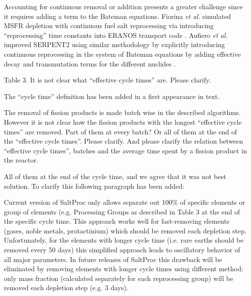 \documentclass[answers,11pt]{exam}
\begin{document}
\begin{questions}
\begin{solution}
                Accounting for continuous removal or addition presents a greater 
                challenge since it requires adding a term to the Bateman equations. 
                Fiorina \emph{et al.} simulated MSFR depletion with continuous
                 fuel salt reprocessing via introducing ``reprocessing'' time 
                constants into ERANOS transport code \cite{fiorina_investigation_2013}. 
                Aufiero \emph{et al.} improved SERPENT2 using similar methodology by 
                explicitly introducing continuous reprocessing in the system of Bateman 
                equations by adding effective decay and transmutation terms for the 
                different nuclides \cite{aufiero_extended_2013}. 
        \end{solution}


        \question Table 3. It is not clear what ``effective cycle times'' are. 
        Please clarify.
        \begin{solution}
                The ``cycle time'' definition has been added in a first appearance in text.
        \end{solution}


        \question The removal of fission products is made batch wise in the 
        described algorithms. However it is not clear how the fission products 
        with the longest ``effective cycle times'' are removed. Part of them at 
        every batch? Or all of them at the end of the  ``effective cycle 
        times''.  Please clarify. And please clarify the relation between 
        ``effective cycle times'', batches and the average time spent by a 
        fission product in the reactor.
        \begin{solution}
                All of them at the end of the cycle time, and we agree that it
                 was not best solution. To clarify this following paragraph has 
                been added:
                 
				Current version of SaltProc only allows separate out 100\% of 
				specific elements or group of elements (e.g. Processing Groups 
				as described in Table 3 at the end
				 of the specific cycle time. This approach works well for 
				fast-removing elements (gases, noble metals, protactinium) which 
				should be removed each depletion step. Unfortunately, for the 
				elements with longer cycle time (i.e. rare earths should be removed 
				every 50 days) this simplified approach leads to oscillatory 
				behavior of all major parameters. In future releases of SaltProc
				 this drawback will be eliminated by removing elements with longer 
				cycle times using different method: only mass fraction (calculated 
				separately for each reprocessing group) will be removed each 
				depletion step (e.g. 3 days).	
        \end{solution}


\end{questions}
\end{document}
